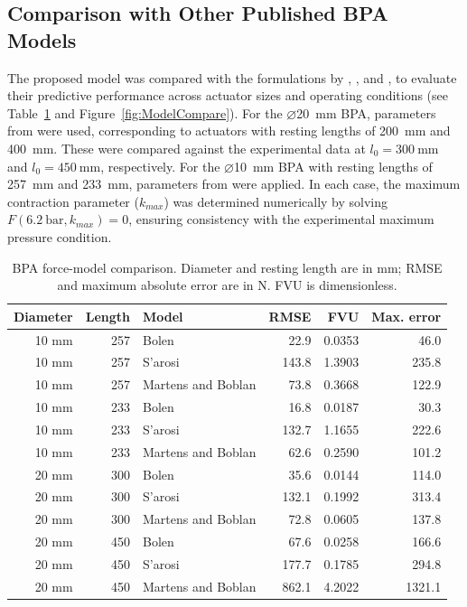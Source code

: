 \subsection{Comparison with Other Published BPA Models}

The proposed model was compared with the formulations by \citet{sarosi_new_2012}, \citet{sarosi_10mm}, and \citet{martens_modeling_2017}, to evaluate their predictive performance across actuator sizes and operating conditions (see Table~\ref{tab:model_compare} and Figure~\ref{fig:ModelCompare}).
For the $\diameter$\qty{20}{\mm} BPA, parameters from \citep{sarosi_new_2012} were used, corresponding to actuators with resting lengths of \qty{200}{\mm} and \qty{400}{\mm}. These were compared against the experimental data at $l_0=\qty{300}{\mm}$ and $l_0=\qty{450}{\mm}$, respectively. For the $\diameter$\qty{10}{\mm} BPA with resting lengths of \qty{257}{\mm} and \qty{233}{\mm}, parameters from \citep{sarosi_10mm} were applied. In each case, the maximum contraction parameter ($k_{max}$) was determined numerically by solving $F(\qty{6.2}{\bar}, k_{max}) = 0$, ensuring consistency with the experimental maximum pressure condition.




\begin{table}[p]
\centering\small
\caption{BPA force-model comparison. Diameter and resting length are in mm; RMSE and maximum absolute error are in N. FVU is dimensionless.}
\label{tab:model_compare}
\begin{tabular}{@{}rrlrrr@{}}
\toprule
Diameter & Length & Model & RMSE & FVU & Max. error\\
\midrule
10 mm & 257 & Bolen & 22.9 & 0.0353 & 46.0\\
10 mm & 257 & S'arosi & 143.8 & 1.3903 & 235.8\\
10 mm & 257 & Martens and Boblan & 73.8 & 0.3668 & 122.9\\
10 mm & 233 & Bolen & 16.8 & 0.0187 & 30.3\\
10 mm & 233 & S'arosi & 132.7 & 1.1655 & 222.6\\
10 mm & 233 & Martens and Boblan & 62.6 & 0.2590 & 101.2\\
20 mm & 300 & Bolen & 35.6 & 0.0144 & 114.0\\
20 mm & 300 & S'arosi & 132.1 & 0.1992 & 313.4\\
20 mm & 300 & Martens and Boblan & 72.8 & 0.0605 & 137.8\\
20 mm & 450 & Bolen & 67.6 & 0.0258 & 166.6\\
20 mm & 450 & S'arosi & 177.7 & 0.1785 & 294.8\\
20 mm & 450 & Martens and Boblan & 862.1 & 4.2022 & 1321.1\\
\bottomrule
\end{tabular}
\end{table}

